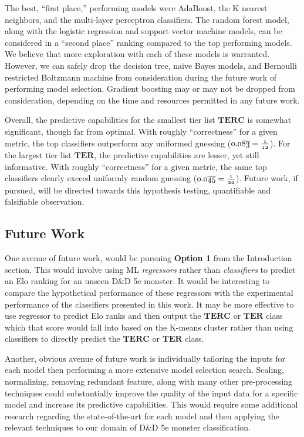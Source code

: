 \documentclass{article}
\newcommand{\Qty}[1]{\oldstylenums{#1}}
\newcommand{\TER}{\ensuremath{\mathbf{TER}}\xspace}
\newcommand{\TERC}{\ensuremath{\mathbf{TERC}}\xspace}
\newcommand{\DnD}{D\&D 5e\xspace}
\begin{document}
The best, ``first place,'' performing models were AdaBoost, the K nearest neighbors, and the multi-layer perceptron classifiers.
The random forest model, along with the logistic regression and support vector machine models, can be considered in a ``second place'' ranking compared to the top performing models.
We believe that more exploration with each of these \Qty{6} models is warranted.
However, we can safely drop the decision tree, naive Bayes models, and Bernoulli restricted Boltzmann machine from consideration during the future work of performing model selection.
Gradient boosting may or may not be dropped from consideration, depending on the time and resources permitted in any future work.

Overall, the predictive capabilities for the smallest tier list \TERC is somewhat significant, though far from optimal.
With roughly \Qty{0.48} ``correctness'' for a given metric, the top classifiers outperform any uniformed guessing ($\Qty{0.08\overline{3}} = \frac{\Qty{1}}{\Qty{12}}$).
For the largest tier list \TER, the predictive capabilities are lesser, yet still informative.
With roughly \Qty{0.29} ``correctness'' for a given metric, the same top classifiers clearly exceed uniformly random guessing ($\Qty{0.0\overline{45}} = \frac{\Qty{1}}{\Qty{22}}$).
Future work, if pursued, will be directed towards this hypothesis testing, quantifiable and falsifiable observation.


\hypertarget{future-work}{%
\subsection{Future Work}}

One avenue of future work, would be pursuing \textbf{Option 1} from the Introduction section.
This would involve using ML \emph{regressors} rather than \emph{classifiers} to predict an Elo ranking for an unseen \DnD monster.
It would be interesting to compare the hypothetical performance of these regressors with the experimental performance of the classifiers presented in this work.
It may be more effective to use regressor to predict Elo ranks and then output the \TERC or \TER class which that score would fall into based on the K-means cluster rather than using classifiers to directly predict the \TERC or \TER class.

Another, obvious avenue of future work is individually tailoring the inputs for each model then performing a more extensive model selection search.
Scaling, normalizing, removing redundant feature, along with many other pre-processing techniques could substantially improve the quality of the input data for a specific model and increase its predictive capabilities.
This would require some additional research regarding the state-of-the-art for each model and then applying the relevant techniques to our domain of \DnD monster classification.
\end{document}
